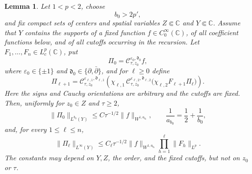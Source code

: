 \documentclass[a4paper,11pt]{article}
\newcommand{\C}{\mathbb{C}}
\theoremstyle{plain}
\newtheorem{lem}[thm]{Lemma}
\theoremstyle{definition}
\theoremstyle{remark}
\begin{document}
\begin{lem}\label{lem-reverse-branch-terminal-gain}
Let $1<p<2$, choose
\begin{equation}\label{reverse-branch-s0-choice}
        b_0>2p',
\end{equation}
and fix compact sets of centers and spatial variables
$Z\Subset\C$ and $Y\Subset\C$.  Assume that $Y$ contains the supports of a
fixed function $f\in C_0^\infty(\C)$, of all coefficient functions below, and
of all cutoffs occurring in the recursion.  Let
$F_1,\ldots,F_n\in L^p_c(\C)$, put
\begin{equation}\label{reverse-branch-terminal-leaf}
        \Pi_0=\mathcal C_{\tau,z_0}^{\varepsilon_0,\mathfrak d_0}f,
\end{equation}
where $\varepsilon_0\in\{\pm1\}$ and
$\mathfrak d_0\in\{\partial,\bar\partial\}$, and for $\ell\geq0$ define
\begin{equation}\label{transposed-branch-recursion}
\Pi_{\ell+1}
=\mathcal C_{\tau,z_0}^{\varepsilon_{\ell,1},\mathfrak d_{\ell,1}}
 \left(
  \chi_{\ell,1}\,
  \mathcal C_{\tau,z_0}^{\varepsilon_{\ell,2},\mathfrak d_{\ell,2}}
  \bigl(\chi_{\ell,2}F_{\ell+1}\Pi_\ell\bigr)
 \right).
\end{equation}
Here the signs and Cauchy orientations are arbitrary and the cutoffs are fixed.
Then, uniformly for $z_0\in Z$ and $\tau\geq2$,
\begin{equation}\label{transposed-branch-terminal-bound}
        \|\Pi_0\|_{L^{b_0}(Y)}
        \leq C\tau^{-1/2}\|f\|_{W^{1,a_{b_0}}},
        \qquad
        \frac1{a_{b_0}}=\frac12+\frac1{b_0},
\end{equation}
and, for every $1\leq\ell\leq n$,
\begin{equation}\label{transposed-branch-Linf-bound}
        \|\Pi_\ell\|_{L^\infty(Y)}
        \leq C_\ell\tau^{-1/2}\|f\|_{W^{1,a_{b_0}}}
        \prod_{h=1}^{\ell}\|F_h\|_{L^p}.
\end{equation}
The constants may depend on $Y,Z$, the order, and the fixed cutoffs, but not on
$z_0$ or $\tau$.
\end{lem}
\end{document}
